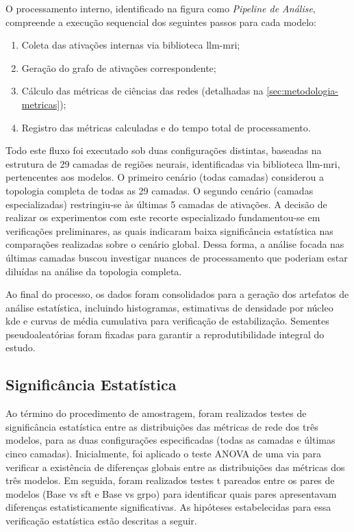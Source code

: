 O processamento interno, identificado na figura como \textit{Pipeline de Análise}, compreende a execução sequencial dos seguintes passos para cada modelo:

\begin{enumerate}
    \item Coleta das ativações internas via biblioteca \gls{llm-mri};
    \item Geração do grafo de ativações correspondente;
    \item Cálculo das métricas de ciências das redes (detalhadas na \autoref{sec:metodologia-metricas});
    \item Registro das métricas calculadas e do tempo total de processamento.
\end{enumerate}

Todo este fluxo foi executado sob duas configurações distintas, baseadas na estrutura de 29 camadas de regiões neurais, identificadas via biblioteca \gls{llm-mri}, pertencentes aos modelos. O primeiro cenário (todas camadas) considerou a topologia completa de todas as 29 camadas. O segundo cenário (camadas especializadas) restringiu-se às últimas 5 camadas de ativações. A decisão de realizar os experimentos com este recorte especializado fundamentou-se em verificações preliminares, as quais indicaram baixa significância estatística nas comparações realizadas sobre o cenário global. Dessa forma, a análise focada nas últimas camadas buscou investigar nuances de processamento que poderiam estar diluídas na análise da topologia completa.

Ao final do processo, os dados foram consolidados para a geração dos artefatos de análise estatística, incluindo histogramas, estimativas de densidade por núcleo \gls{kde} e curvas de média cumulativa para verificação de estabilização. Sementes pseudoaleatórias foram fixadas para garantir a reprodutibilidade integral do estudo.

\subsection{Significância Estatística}

Ao término do procedimento de amostragem, foram realizados testes de significância estatística entre as distribuições das métricas de rede dos três modelos, para as duas configurações especificadas (todas as camadas e últimas cinco camadas). Inicialmente, foi aplicado o teste ANOVA de uma via para verificar a existência de diferenças globais entre as distribuições das métricas dos três modelos. Em seguida, foram realizados testes t pareados entre os pares de modelos (Base vs \gls{sft} e Base vs \gls{grpo}) para identificar quais pares apresentavam diferenças estatisticamente significativas. As hipóteses estabelecidas para essa verificação estatística estão descritas a seguir.

